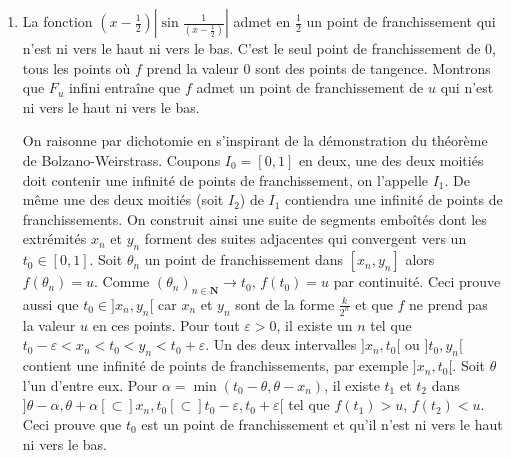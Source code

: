 \begin{enumerate}
  \item La fonction $(x-\frac{1}{2})| \sin \frac{1}{(x-\frac{1}{2})}| $ admet en $\frac{1}{2}$ un point de franchissement qui n'est ni vers le haut ni vers
le bas. C'est le seul point de franchissement de $0$, tous les points o{\`u} $f$ prend la valeur 0 sont des points de tangence.\newline
Montrons que $F_{u}$ infini entra\^{i}ne que $f$ admet un point de franchissement de $u$ qui n'est ni vers le haut ni vers le bas.

On raisonne par dichotomie en s'inspirant de la d{\'e}monstration du th{\'e}or{\`e}me de Bolzano-Weirstrass.\newline
Coupons $I_{0}=[ 0,1] $ en deux, une des deux moiti{\'e}s doit contenir une infinit{\'e} de points de franchissement, on l'appelle $I_{1}$.
De m{\^e}me une des deux moiti{\'e}s (soit $I_{2}$) de $I_{1}$ contiendra une infinit{\'e} de points de franchissements.
On construit ainsi une suite de segments embo\^{i}t{\'e}s dont les extr{\'e}mit{\'e}s $x_{n}$ et $y_{n}$ forment des suites adjacentes qui convergent vers un
$t_{0}\in [0,1] $.\newline
Soit $\theta _{n}$ un point de franchissement dans $[ x_{n},y_{n}] $ alors $f(\theta _{n})=u$.
Comme $(\theta _{n})_{n\in \mathbf{N}} \rightarrow t_{0}$, $f(t_{0})=u$ par continuit{\'e}.
Ceci prouve aussi que $t_{0}\in ] x_{n},y_{n}[ $ car $x_{n}$ et $y_{n}$ sont de la forme $\frac{k}{2^{n}}$ et que $f$ ne prend pas la valeur $u$ en ces points.\newline
Pour tout $\varepsilon >0$, il existe un $n$ tel que $t_{0}-\varepsilon <x_{n}<t_{0}<y_{n}<t_{0}+\varepsilon $.
Un des deux intervalles $]x_{n},t_{0}[ $ ou $] t_{0},y_{n}[ $ contient une infinit{\'e} de points de franchissements, par exemple $] x_{n},t_{0}[$.
Soit $\theta $ l'un d'entre eux.\newline
Pour $\alpha =\min (t_{0}-\theta ,\theta -x_{n})$, il existe $t_{1}$ et $t_{2}$ dans
$] \theta -\alpha ,\theta +\alpha [ \subset ] x_{n},t_{0}[ \subset ] t_{0}-\varepsilon ,t_{0}+\varepsilon [ $
tel que $f(t_{1})>u$, $f(t_{2})<u$.
Ceci prouve que $t_{0}$ est un point de franchissement et qu'il n'est ni vers le haut ni vers le bas.
\end{enumerate}
